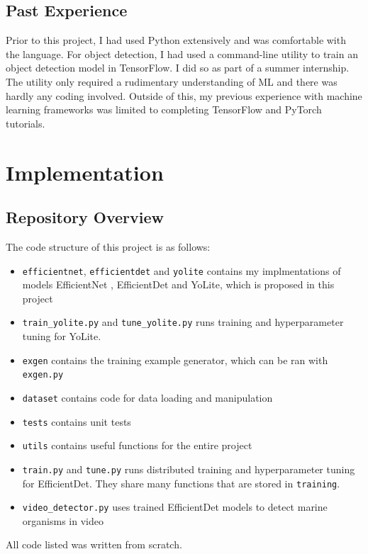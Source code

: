 \documentclass[12pt,a4paper,twoside,openany]{report}
\begin{document}
\section{Past Experience}
Prior to this project, I had used Python extensively and was comfortable with the language. For object detection, I had used a command-line utility to train an object detection model in TensorFlow. I did so as part of a summer internship. The utility only required a rudimentary understanding of ML and there was hardly any coding involved. Outside of this, my previous experience with machine learning frameworks was limited to completing TensorFlow and PyTorch tutorials.

\chapter{Implementation}
\section{Repository Overview}
The code structure of this project is as follows:
\begin{center}
    
\end{center}
\begin{itemize}\itemsep0em
    \item \verb|efficientnet|, \verb|efficientdet| and \verb|yolite| contains my implmentations of models EfficientNet \cite{tan_efficientnet_2020}, EfficientDet \cite{tan_efficientdet_2020} and YoLite, which is proposed in this project
    \item \verb|train_yolite.py| and \verb|tune_yolite.py| runs training and hyperparameter tuning for YoLite.
    \item \verb|exgen| contains the training example generator, which can be ran with \verb|exgen.py|
    \item \verb|dataset| contains code for data loading and manipulation
    \item \verb|tests| contains unit tests
    \item \verb|utils| contains useful functions for the entire project
    \item \verb|train.py| and \verb|tune.py| runs distributed training and hyperparameter tuning for EfficientDet. They share many functions that are stored in \verb|training|. 
    \item \verb|video_detector.py| uses trained EfficientDet models to detect marine organisms in video
\end{itemize}
All code listed was written from scratch. 
\end{document}
